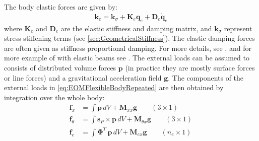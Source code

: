 \documentclass[wes, manuscript]{copernicus}
\renewcommand{\v}[1]{\boldsymbol{#1}}
\newcommand{\m}[1]{\boldsymbol{#1}}
\begin{document}
% 
The body elastic forces are given by:
\begin{align}
  \v{k}_e =  \v{k}_\sigma + \m{K}_e \v{q}_e  + \m{D}_e \v{\dot{q}}_e     %
\end{align}
where $\m{K}_e$ and $\m{D}_e$ are the elastic stiffness and damping matrix, and $\v{k}_\sigma$ represent stress stiffening terms (see \autoref{sec:GeometricalStiffness}). 
The elastic damping forces are often given as stiffness proportional damping.
For more details, see \cite{Wallrapp:1994}, and for more example of with elastic beams see \cite{branlard:2019flex}.
% 
The external loads can be assumed to consists of distributed volume forces $\v{p}$ (in practice they are mostly surface forces or line forces) and a gravitational acceleration field $\v{g}$.
The components of the external loads  in  \autoref{eq:EOMFlexibleBodyRepeated} are then obtained by integration over the whole body:
\begin{align}
    \v{f}_x&=\int \v{p} \, dV
        + \m{M}_{xx}\v{g}
        \qquad (3\times 1)
            \label{eq:genQgeneral}
    \\
    \v{f}_\theta&=\int \v{s}_P\times\v{p} \, dV
        + \m{M}_{\theta x}\v{g}
        \qquad (3\times 1)
    \\
    \v{f}_e&=\int {\m{\Phi}}^T\, \v{p} \, dV
        + \m{M}_{e x}\v{g}
        \qquad (n_e\times 1)
\end{align}



\end{document}
